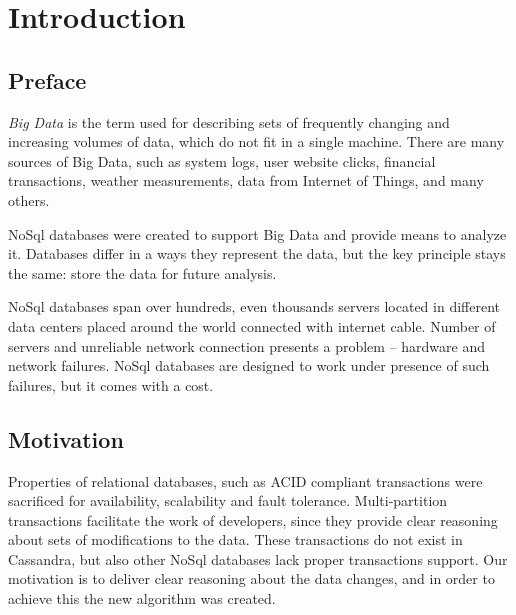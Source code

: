 
\chapter{Introduction}\label{chapter:introduction}

\section{Preface}\label{sec:introduction:preface}
\emph{Big Data} is the term used for describing sets of frequently changing and increasing volumes of data, which do not fit in a single machine. There are many sources of Big Data, such as system logs, user website clicks, financial transactions, weather measurements, data from Internet of Things, and many others. 

NoSql databases were created to support Big Data and provide means to analyze it. Databases differ in a ways they represent the data, but the key principle stays the same: store the data for future analysis.

NoSql databases span over hundreds, even thousands servers located in different data centers placed around the world connected with internet cable. Number of servers and unreliable network connection presents a problem -- hardware and network failures.
NoSql databases are designed to work under presence of such failures, but it comes with a cost.

\section{Motivation}\label{sec:introduction:motivation}


Properties of relational databases, such as ACID compliant transactions were sacrificed for availability, scalability and fault tolerance. Multi-partition transactions facilitate the work of developers, since they provide clear reasoning about sets of modifications to the data. These transactions do not exist in Cassandra, but also other NoSql databases lack proper transactions support.
Our motivation is to deliver clear reasoning about the data changes, and in order to achieve this the new algorithm was created.


